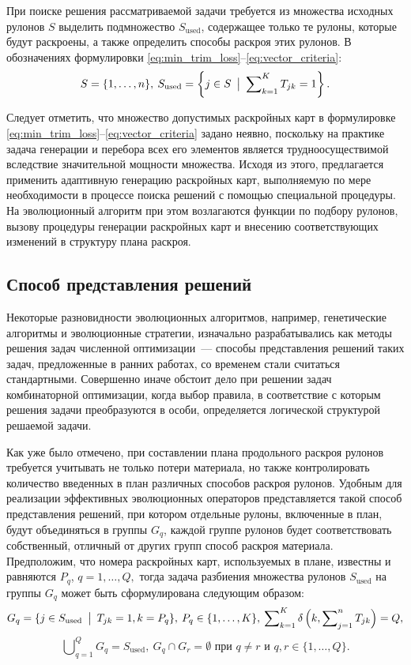 \documentclass[12pt]{article}
\begin{document}
При поиске решения рассматриваемой задачи требуется из множества исходных 
рулонов $S$ выделить подмножество $S_{\text{used}}$, содержащее только те 
рулоны, которые будут раскроены, а также определить способы раскроя этих 
рулонов. В обозначениях формулировки 
\eqref{eq:min_trim_loss}--\eqref{eq:vector_criteria}:
\[ S=\{1,\ldots,n\},\: 
   S_{\text{used}}=\left\{ j \in S \: \bigm| \: \sum\nolimits_{k=1}^{K} T_{jk}=1 \right\}. \]

Следует отметить, что множество допустимых раскройных карт в формулировке 
\eqref{eq:min_trim_loss}--\eqref{eq:vector_criteria} 
задано неявно, поскольку на практике задача генерации и перебора всех 
его элементов является трудноосуществимой вследствие значительной мощности 
множества. Исходя из этого, предлагается применить адаптивную генерацию 
раскройных карт, выполняемую по мере необходимости в процессе поиска решений 
с помощью специальной процедуры. На эволюционный алгоритм при этом возлагаются 
функции по подбору рулонов, вызову процедуры генерации раскройных карт и 
внесению соответствующих изменений в структуру плана раскроя.

\subsection{Способ представления решений}

Некоторые разновидности эволюционных алгоритмов, например, генетические
алгоритмы и эволюционные стратегии, изначально разрабатывались как методы 
решения задач численной оптимизации~--- способы представления решений таких 
задач, предложенные в ранних работах, со временем стали считаться стандартными. 
Совершенно иначе обстоит дело при решении задач комбинаторной оптимизации, 
когда выбор правила, в соответствие с которым решения задачи преобразуются в 
особи, определяется логической структурой решаемой задачи.

Как уже было отмечено, при составлении плана продольного раскроя рулонов 
требуется учитывать не только потери материала, но также контролировать 
количество введенных в план различных способов раскроя рулонов. Удобным для 
реализации эффективных эволюционных операторов представляется такой способ 
представления решений, при котором отдельные рулоны, включенные в план, 
будут объединяться в группы $G_q$, каждой группе рулонов будет соответствовать 
собственный, отличный от других групп способ раскроя материала. Предположим, 
что номера раскройных карт, используемых в плане, известны и равняются $P_q$, 
$q=1,\ldots,Q,$ тогда задача разбиения множества рулонов $S_{\text{used}}$ 
на группы $G_q$ может быть сформулирована следующим образом:
\[ G_q=\{ j \in S_{\text{used}} \: \bigm| \: T_{jk}=1,k=P_q \}, \: 
   P_q \in \{1,\ldots,K\}, \: 
   \sum\nolimits_{k=1}^{K} \delta\left(k, \sum\nolimits_{j=1}^{n} T_{jk}\right)=Q, \]
\[ \bigcup\nolimits_{q=1}^{Q}G_q=S_{\text{used}}, \: 
   G_q \cap G_r=\emptyset \text{ при } q \neq r \text{ и } q,r \in \{1,\ldots,Q\}.
\]
\end{document}
